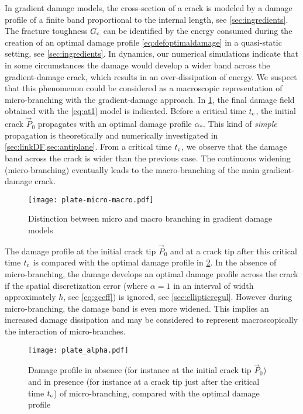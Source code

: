 In gradient damage models, the cross-section of a crack is modeled by a damage profile of a finite band proportional to the internal length, see \cref{sec:ingredients}. The fracture toughness $G_\mathrm{c}$ can be identified by the energy consumed during the creation of an optimal damage profile \eqref{eq:defoptimaldamage} in a quasi-static setting, see \cref{sec:ingredients}. In dynamics, our numerical simulations indicate that in some circumstances the damage would develop a wider band across the gradient-damage crack, which results in an over-dissipation of energy. We suspect that this phenomenon could be considered as a macroscopic representation of micro-branching with the gradient-damage approach. In \cref{fig:micro-macro}, the final damage field obtained with the \eqref{eq:at1} model is indicated. Before a critical time $t_{\mathrm{c}}$, the initial crack $\vec{P}_0$ propagates with an optimal damage profile $\alpha_*$. This kind of \emph{simple} propagation is theoretically and numerically investigated in \cref{sec:linkDF,sec:antiplane}. From a critical time $t_{\mathrm{c}}$, we observe that the damage band across the crack is wider than the previous case. The continuous widening (micro-branching) eventually leads to the macro-branching of the main gradient-damage crack. 
\begin{figure}[htbp]
\centering
\texttt{[image: plate-micro-macro.pdf]}
\caption{Distinction between micro and macro branching in gradient damage models} \label{fig:micro-macro}
\end{figure}

The damage profile at the initial crack tip $\vec{P}_0$ and at a crack tip after this critical time $t_{\mathrm{c}}$ is compared with the optimal damage profile in \cref{fig:plate_alpha}. In the absence of micro-branching, the damage develops an optimal damage profile across the crack if the spatial discretization error (where $\alpha=1$ in an interval of width approximately $h$, see \eqref{eq:gceff}) is ignored, see \cref{sec:ellipticregul}. However during micro-branching, the damage band is even more widened. This implies an increased damage dissipation and may be considered to represent macroscopically the interaction of micro-branches. 
\begin{figure}[htbp]
\centering
\texttt{[image: plate\_alpha.pdf]}
\caption{Damage profile in absence (for instance at the initial crack tip $\vec{P}_0$) and in presence (for instance at a crack tip just after the critical time $t_{\mathrm{c}}$) of micro-branching, compared with the optimal damage profile} \label{fig:plate_alpha}
\end{figure}

